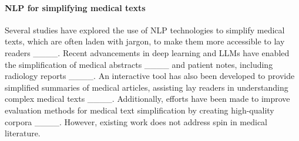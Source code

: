 \paragraph{NLP for simplifying medical texts} Several studies have explored the use of NLP technologies to simplify medical texts, which are often laden with jargon, to make them more accessible to lay readers ____. Recent advancements in deep learning and LLMs have enabled the simplification of medical abstracts ____ and patient notes, including radiology reports ____. An interactive tool has also been developed to provide simplified summaries of medical articles, assisting lay readers in understanding complex medical texts ____. Additionally, efforts have been made to improve evaluation methods for medical text simplification by creating high-quality corpora ____. However, existing work does not address spin in medical literature.